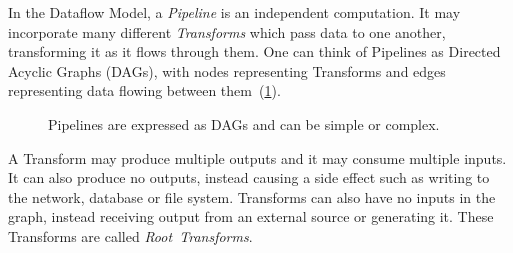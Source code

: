 In the Dataflow Model, a \emph{Pipeline} is an independent computation.
It may incorporate many different \emph{Transforms} which pass data to one another, transforming it as it flows through them.
One can think of Pipelines as Directed Acyclic Graphs (DAGs), with nodes representing Transforms and edges representing data flowing between them~(\cref{fig:prep:pipeline-dags}).

\begin{figure}
	\caption[Examples of Pipelines, simple and complex, illustrated as Directed Acyclic Graphs.]{Pipelines are expressed as DAGs and can be simple or complex.}
	\label{fig:prep:pipeline-dags}
\end{figure}

A Transform may produce multiple outputs and it may consume multiple inputs.
It can also produce no outputs, instead causing a side effect such as writing to the network, database or file system.
Transforms can also have no inputs in the graph, instead receiving output from an external source or generating it.
These Transforms are called \emph{Root~Transforms}.

